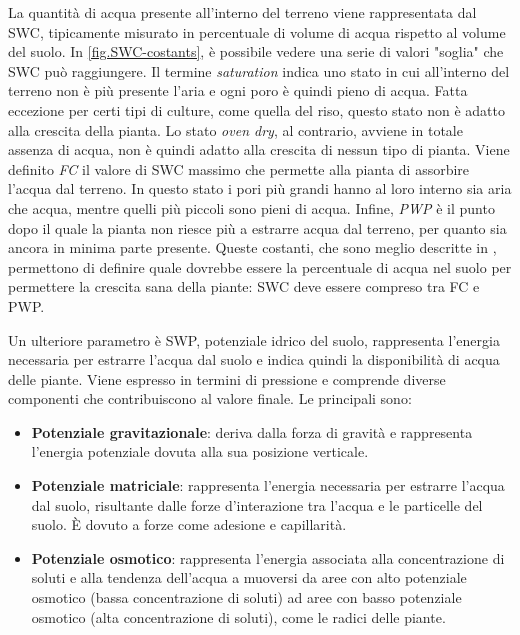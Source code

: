 \documentclass[12pt,a4paper,openright,twoside]{book}
\begin{document}
La quantità di acqua presente all'interno del terreno viene rappresentata dal \ac{SWC}, tipicamente misurato in percentuale di volume di acqua rispetto al volume del suolo.
In \cref{fig.SWC-costants}, è possibile vedere una serie di valori "soglia" che \ac{SWC} può raggiungere.\newline
Il termine \textit{saturation} indica uno stato in cui all'interno del terreno non è più presente l'aria e ogni poro è quindi pieno di acqua. Fatta eccezione per certi tipi di culture, come quella del riso, questo stato non è adatto alla crescita della pianta.\newline
Lo stato \textit{oven dry}, al contrario, avviene in totale assenza di acqua, non è quindi adatto alla crescita di nessun tipo di pianta.\newline
Viene definito \textit{\ac{FC}} il valore di \ac{SWC} massimo che permette alla pianta di assorbire l'acqua dal terreno. In questo stato i pori più grandi hanno al loro interno sia aria che acqua, mentre quelli più piccoli sono pieni di acqua.\newline
Infine, \textit{\ac{PWP}} è il punto dopo il quale la pianta non riesce più a estrarre acqua dal terreno, per quanto sia ancora in minima parte presente.\newline
Queste costanti, che sono meglio descritte in \cite{RAI2017505}, permettono di definire quale dovrebbe essere la percentuale di acqua nel suolo per permettere la crescita sana della piante: \ac{SWC} deve essere compreso tra \ac{FC} e \ac{PWP}.

Un ulteriore parametro è \ac{SWP}, potenziale idrico del suolo, rappresenta l'energia necessaria per estrarre l'acqua dal suolo e indica quindi la disponibilità di acqua delle piante. Viene espresso in termini di pressione e comprende diverse componenti che contribuiscono al valore finale\cite{MarshallT.J.TheoJohn1996Sp}. Le principali sono:

\begin{itemize}[noitemsep]
    \item \textbf{Potenziale gravitazionale}: deriva dalla forza di gravità e rappresenta l'energia potenziale dovuta alla sua posizione verticale.
    \item \textbf{Potenziale matriciale}: rappresenta l'energia necessaria per estrarre l'acqua dal suolo, risultante dalle forze d'interazione tra l'acqua e le particelle del suolo. È dovuto a forze come adesione e capillarità.
    \item \textbf{Potenziale osmotico}: rappresenta l'energia associata alla concentrazione di soluti e alla tendenza dell'acqua a muoversi da aree con alto potenziale osmotico (bassa concentrazione di soluti) ad aree con basso potenziale osmotico (alta concentrazione di soluti), come le radici delle piante.
\end{itemize}
\end{document}
